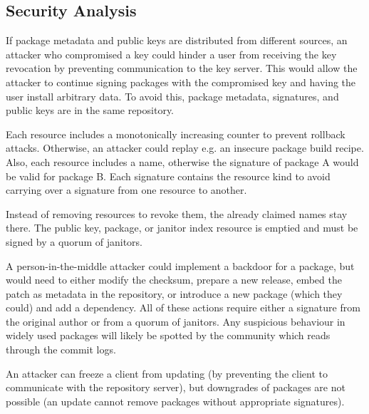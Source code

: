\documentclass[nocopyrightspace]{sigplanconf}
\newcommand{\TODO}[1]{\textbf{[TODO: #1]}}
\begin{document}
\subsection{Security Analysis}

If package metadata and public keys are distributed from different sources, an attacker who compromised a key could hinder a user from receiving the key revocation by preventing communication to the key server.
This would allow the attacker to continue signing packages with the compromised key and having the user install arbitrary data.
To avoid this, package metadata, signatures, and public keys are in the same repository.

Each resource includes a monotonically increasing counter to prevent rollback attacks.
Otherwise, an attacker could replay e.g. an insecure package build recipe.
Also, each resource includes a name, otherwise the signature of package A would be valid for package B.
Each signature contains the resource kind to avoid carrying over a signature from one resource to another.

Instead of removing resources to revoke them, the already claimed names stay there.
The public key, package, or janitor index resource is emptied and must be signed by a quorum of janitors.

A person-in-the-middle attacker could implement a backdoor for a package, but would need to either modify the checksum, prepare a new release, embed the patch as metadata in the repository, or introduce a new package (which they could) and add a dependency.
All of these actions require either a signature from the original author or from a quorum of janitors.
Any suspicious behaviour in widely used packages will likely be spotted by the community which reads through the commit logs.

An attacker can freeze a client from updating (by preventing the client to communicate with the repository server), but downgrades of packages are not possible (an update cannot remove packages without appropriate signatures).
\end{document}
